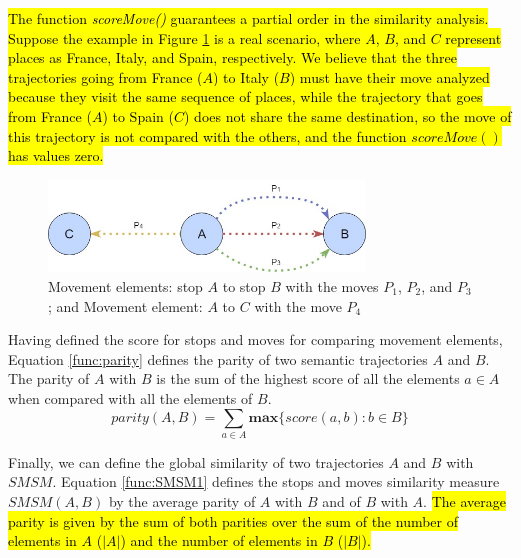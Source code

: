 \documentclass[12pt]{article}
\begin{document}
\hl{The function \emph{scoreMove()} guarantees a partial order in the similarity analysis. %
Suppose the example in  Figure {\ref{fig:move}} is a real scenario, where $A$, $B$, and $C$ represent  places as France, Italy, and Spain, respectively. We believe that the three trajectories going from France ($A$) to Italy ($B$) must have their move analyzed because they visit the same sequence of places, while the trajectory that goes from France ($A$) to Spain ($C$) does not share the same destination, so the move of this trajectory is not compared with the others, and the function $scoreMove()$ has values zero.}



\begin{figure}[h]
\centering
\includegraphics[width=0.75\textwidth]{Images/Toy_trajectories.jpg}
\caption{\label{fig:move} Movement elements: stop $A$ to stop $B$ with the moves $P_1$, $P_2$, and $P_3$; and Movement element: $A$ to $C$ with the move $P_4$}
\end{figure}

Having defined the score for stops and moves for comparing movement elements, Equation \ref{func:parity} defines the parity of two semantic trajectories $A$ and $B$. The parity of $A$ with $B$ is the sum of the highest score of all the elements $a \in A$ when compared with all the elements of $B$.
\begin{equation}
\label{func:parity}
parity(A, B) = \sum\limits_{a\in A} \textbf{max}\{\textit{score}(a, b) : b \in B\}
\end{equation}

Finally, we can define the global similarity of two trajectories $A$ and $B$ with $SMSM$. Equation \ref{func:SMSM1} defines the stops and moves similarity measure $SMSM(A,B)$ by the average parity of $A$ with $B$ and of $B$ with $A$. \hl{The average parity is given by the sum of both parities over the sum of the number of elements in $A$ ($|A|$) and the number of elements in $B$ ($|B|$).}
\end{document}
